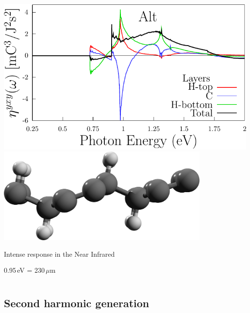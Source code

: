 \documentclass{beamer}
\begin{document}
\begin{frame}
\begin{columns}
\begin{center}
\includegraphics[width=0.99\textwidth]{figs/plots/eta-alt_y.pdf}
\vspace{3mm}
\includegraphics[width=0.8\textwidth]{figs/alt2.png}

Intense response in the Near Infrared

0.95\,eV = 230\,$\mu$m

\end{center}

\end{columns}

\end{frame}



\subsection{Second harmonic generation}
\end{document}
